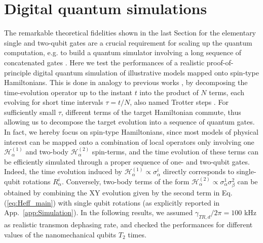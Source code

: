 \documentclass[aps,twocolumn,groupedaddress,superscriptaddress,floatfix,amsmath,amssymb,prb]{revtex4-1}
\begin{document}
\section{Digital quantum simulations}

The remarkable theoretical fidelities shown in the last Section for the elementary single and two-qubit gates are a crucial requirement for scaling up the quantum computation, e.g. to build a quantum simulator involving a long sequence of concatenated gates \cite{Georgescu2014}. 
Here we test the performances of a realistic proof-of-principle digital quantum simulation of illustrative models mapped onto spin-type Hamiltonians. This is done in analogy to previous works \cite{Santini2011,LasHeras2014,Chiesa2015}, by decomposing the time-evolution operator up to the instant $t$ into the product of $N$ terms, each evolving for short time intervals $\tau=t/N$, also named Trotter steps \cite{Lloyd1996}. 
For sufficiently small $\tau$, different terms of the target Hamiltonian commute, thus allowing us to decompose the target evolution into a sequence of quantum gates. In fact, we hereby focus on spin-type Hamiltonians, since most models of physical interest can be mapped onto a combination of local operators only involving one $\mathcal{H}_\alpha^{(1)}$ and two-body $\mathcal{H}_\alpha^{(2)}$ spin-terms, and the time evolution of these terms can be efficiently simulated through a proper sequence of one- and two-qubit gates. Indeed, the time evolution induced by $\mathcal{H}_\alpha^{(1)} \propto \sigma_\alpha^i$ directly corresponds to single-qubit rotations $R_\alpha^i$. Conversely, two-body terms of the form $\mathcal{H}_\alpha^{(2)} \propto \sigma_\alpha^1 \sigma_\beta^2$ can be obtained by combining the XY evolution given by the second term in Eq. (\ref{eq:Heff_main}) with single qubit rotations (as explicitly reported in App.~\ref{app:Simulation}).
In the following results, we assumed $\gamma_{TR,d}/2\pi =100$ kHz as realistic transmon dephasing rate, and checked the performances for different values of the nanomechanical qubits $T_2$ times.  
\end{document}
